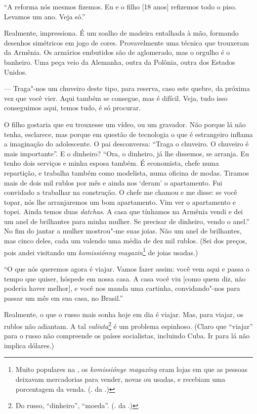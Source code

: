 ``A reforma nós mesmos fizemos. Eu e o filho [18 anos] refizemos todo o piso. Levamos um ano. Veja só.''

Realmente, impressiona. É um soalho de madeira entalhada à mão, formando desenhos simétricos em jogo de cores. Provavelmente uma
técnica que trouxeram da Armênia. Os armários embutidos são de aglomerado, mas o orgulho é o banheiro. Uma peça veio da Alemanha, outra da Polônia, outra dos Estados Unidos.

--- Traga"-nos um chuveiro deste tipo, para reserva, caso este quebre, da próxima vez que você vier. Aqui também se consegue, mas é difícil. Veja, tudo isso conseguimos aqui, temos tudo, é só procurar.

O filho gostaria que eu trouxesse um vídeo, ou um gravador. Não porque lá não tenha, esclarece, mas porque em questão de tecnologia o que é estrangeiro inflama a imaginação do adolescente. O pai desconversa: ``Traga o chuveiro. O chuveiro é mais importante''. E o dinheiro? ``Ora, o dinheiro, já lhe dissemos, se arranja. Eu tenho dois serviços e minha esposa também. É economista, chefe numa repartição, e trabalha também como modelista, numa oficina de modas. Tiramos mais de dois mil rublos por mês e ainda nos `deram' o apartamento. Fui convidado a trabalhar na construção. O chefe me chamou e me disse: se você topar, nós lhe arranjaremos um bom apartamento. Vim ver o apartamento e topei. Ainda temos duas \emph{datchas}. A casa que tínhamos na Armênia vendi e dei um anel de brilhantes para minha mulher. Se precisar de dinheiro, vendo o anel.'' No fim do jantar a mulher mostrou"-me suas joias. Não um anel de brilhantes, mas cinco deles, cada um valendo uma média de dez mil rublos. (Sei dos preços, pois andei visitando um \emph{komissiónny magazin}\footnote{Muito populares na , os \emph{komissiónye magazíny} eram lojas em que as pessoas deixavam mercadorias para vender, novas ou usadas, e recebiam uma porcentagem da venda. (. da .)} de joias usadas.)

``O que nós queremos agora é viajar. Vamos fazer assim: você vem aqui e passa o tempo que quiser, hóspede em nossa casa. A casa você viu [como quem diz, não poderia haver melhor], e você nos manda uma cartinha, convidando"-nos para passar um mês em sua casa, no Brasil.''

Realmente, o que o russo mais sonha hoje em dia é viajar. Mas, para viajar, os rublos não adiantam. A tal \emph{valiuta}\footnote{Do russo, ``dinheiro'', ``moeda''. (. da .)} é um problema espinhoso. (Claro que ``viajar'' para o russo não compreende os países socialistas, incluindo Cuba. Ir para lá não implica dólares.)

